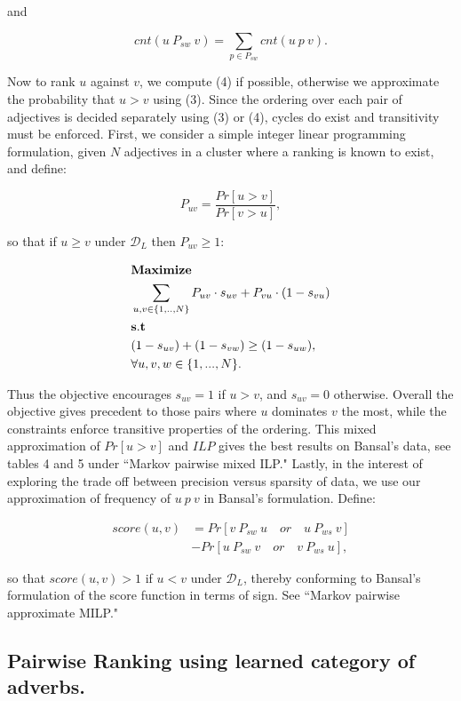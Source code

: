 and

\[
	cnt(u \: P_{sw} \: v) = \sum_{p \in P_{sw}} cnt(u \: p \: v).
\]

Now to rank $u$ against $v$, we compute (4) if possible, otherwise we approximate the probability that $u > v$ using (3). Since the ordering over each pair of adjectives is decided separately using (3) or (4), cycles do exist and transitivity must be enforced. First, we consider a simple integer linear programming formulation, given $N$ adjectives in a cluster where a ranking is known to exist, and define: 

\[
	P_{uv} = \frac{Pr[u > v]}{Pr[v > u]},
\]

so that if $u \ge v$ under $\mathcal{D}_L$ then $P_{uv} \ge 1$:

\begin{align*}
	&{\bf Maximize}\\
	&\sum_{u,v \in \{1,..,N\}} P_{uv} \cdot s_{uv} + P_{vu} \cdot (1 - s_{vu}) \\
	&{\bf s.t}\\
	&(1 - s_{uv}) + (1 - s_{vw}) \geq (1 - s_{uw}),  \\
	&\forall u,v,w \in \{1,...,N\}.\\
\end{align*}

Thus the objective encourages $s_{uv} = 1$ if $u > v$, and $s_{uv} = 0$ otherwise. Overall the objective gives precedent to those pairs where $u$ dominates $v$ the most, while the constraints enforce transitive properties of the ordering. This mixed approximation of $Pr[u > v]$ and $ILP$ gives the best results on Bansal's data, see tables 4 and 5 under ``Markov pairwise mixed ILP." Lastly, in the interest of exploring the trade off between precision versus sparsity of data, we use our approximation of frequency of $u \: p \: v$ in Bansal's formulation. Define:

\begin{align*}
  score(u,v) &= Pr[ v \: P_{sw} \: u \quad or \quad u \: P_{ws} \: v] \\
              &- Pr[ u \: P_{sw} \: v  \quad or \quad v \: P_{ws} \: u],
\end{align*}

so that $score(u,v) > 1$ if $u < v$ under $\mathcal{D}_L$, thereby conforming to Bansal's formulation of the score function in terms of sign. See ``Markov pairwise approximate MILP."

\subsection{Pairwise Ranking using learned category of adverbs.}

